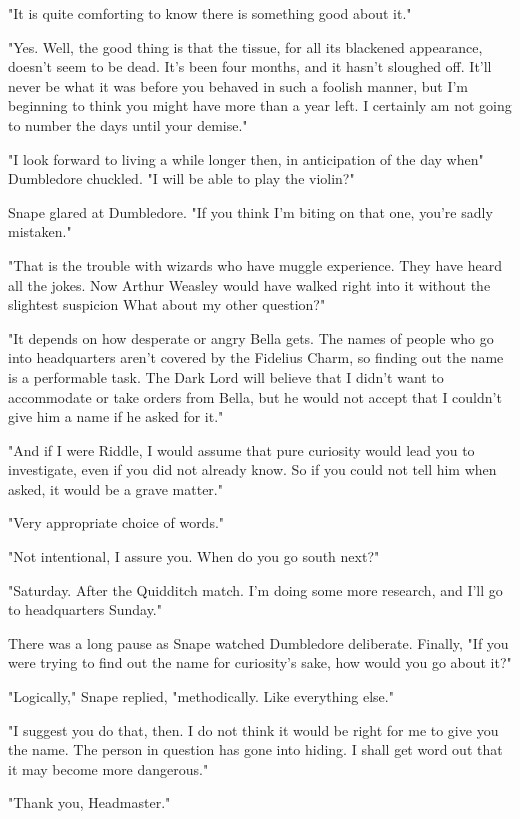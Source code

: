 "It is quite comforting to know there is something good about it."

"Yes. Well, the good thing is that the tissue, for all its blackened appearance, doesn't seem to be dead. It's been four months, and it hasn't sloughed off. It'll never be what it was before you behaved in such a foolish manner, but I'm beginning to think you might have more than a year left. I certainly am not going to number the days until your demise."

"I look forward to living a while longer then, in anticipation of the day when{\el}" Dumbledore chuckled. "I will be able to play the violin?"

Snape glared at Dumbledore. "If you think I'm biting on that one, you're sadly mistaken."

"That is the trouble with wizards who have muggle experience. They have heard all the jokes. Now Arthur Weasley would have walked right into it without the slightest suspicion{\el} What about my other question?"

"It depends on how desperate or angry Bella gets. The names of people who go into headquarters aren't covered by the Fidelius Charm, so finding out the name is a performable task. The Dark Lord will believe that I didn't want to accommodate or take orders from Bella, but he would not accept that I couldn't give him a name if he asked for it."

"And if I were Riddle, I would assume that pure curiosity would lead you to investigate, even if you did not already know. So if you could not tell him when asked, it would be a grave matter."

"Very appropriate choice of words."

"Not intentional, I assure you. When do you go south next?"

"Saturday. After the Quidditch match. I'm doing some more research, and I'll go to headquarters Sunday."

There was a long pause as Snape watched Dumbledore deliberate. Finally, "If you were trying to find out the name for curiosity's sake, how would you go about it?"

"Logically," Snape replied, "methodically. Like everything else."

"I suggest you do that, then. I do not think it would be right for me to give you the name. The person in question has gone into hiding. I shall get word out that it may become more dangerous."

"Thank you, Headmaster."

